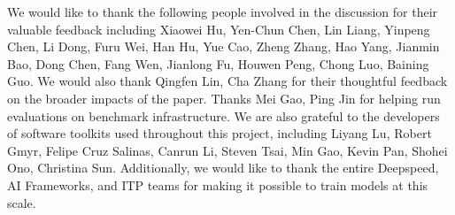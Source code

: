 \documentclass{article}
\begin{document}
We would like to thank the following people involved in the discussion for their valuable feedback including Xiaowei Hu, Yen-Chun Chen, Lin Liang, Yinpeng Chen, Li Dong, Furu Wei, Han Hu, Yue Cao, Zheng Zhang, Hao Yang, Jianmin Bao, Dong Chen, Fang Wen, Jianlong Fu, Houwen Peng, Chong Luo, Baining Guo. We would also thank Qingfen Lin, Cha Zhang for their thoughtful feedback on the broader impacts of the paper. Thanks Mei Gao, Ping Jin for helping run evaluations on benchmark infrastructure. We are also grateful to the developers
of software toolkits used throughout this project, including Liyang Lu, Robert Gmyr, Felipe Cruz Salinas, Canrun Li, Steven Tsai, Min Gao, Kevin Pan, Shohei Ono, Christina Sun. Additionally, we would like to thank the entire Deepspeed, AI Frameworks, and ITP teams for making it possible to train models at this scale.




%
%
\end{document}
